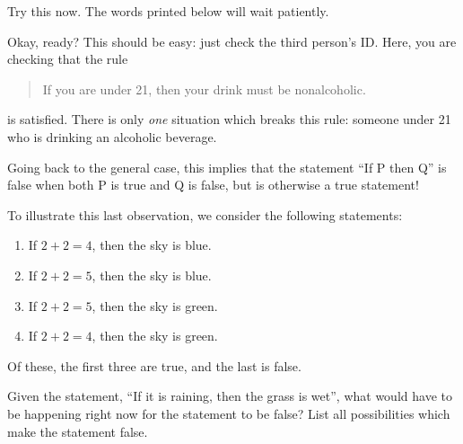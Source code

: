 \documentclass{tufte-book}
\begin{document}
Try this now. The words printed below will wait patiently.

\begin{center}
{\Large\Clocklogo}
\end{center}

Okay, ready? This should be easy: just check the third person's ID. Here, you are checking that the rule
\begin{quote}
  If you are under 21, then your drink must be nonalcoholic.
\end{quote}
is satisfied. There is only \emph{one} situation which breaks this rule: someone under 21 who is drinking an alcoholic beverage. 

Going back to the general case, this implies that the statement ``If P then Q'' is false when both P is true and Q is false, but is otherwise a true statement!

To illustrate this last observation, we consider the following statements:
\begin{enumerate}
    \item If $2 + 2 = 4$, then the sky is blue.
    \item If $2 + 2 = 5$, then the sky is blue.
    \item If $2 + 2 = 5$, then the sky is green.
    \item If $2 + 2 = 4$, then the sky is green.
\end{enumerate}
Of these, the first three are true, and the last is false.
\begin{example}
  Given the statement, ``If it is raining, then the grass is wet'', what would have to be happening right now for the statement to be false? List all possibilities which make the statement false.
\end{example}


\end{document}
